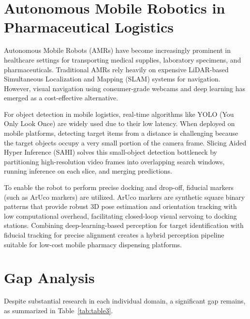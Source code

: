 \documentclass[12pt,a4paper,oneside]{report}
\begin{document}
\section{Autonomous Mobile Robotics in Pharmaceutical
Logistics}\label{autonomous-mobile-robotics-in-pharmaceutical-logistics}

Autonomous Mobile Robots (AMRs) have become increasingly prominent in
healthcare settings for transporting medical supplies, laboratory
specimens, and pharmaceuticals. Traditional AMRs rely heavily on
expensive LiDAR-based Simultaneous Localization and Mapping (SLAM)
systems for navigation. However, visual navigation using consumer-grade
webcams and deep learning has emerged as a cost-effective alternative.

For object detection in mobile logistics, real-time algorithms like YOLO
(You Only Look Once) are widely used due to their low latency. When
deployed on mobile platforms, detecting target items from a distance is
challenging because the target objects occupy a very small portion of
the camera frame. Slicing Aided Hyper Inference (SAHI) solves this
small-object detection bottleneck by partitioning high-resolution video
frames into overlapping search windows, running inference on each slice,
and merging predictions.

To enable the robot to perform precise docking and drop-off, fiducial
markers (such as ArUco markers) are utilized. ArUco markers are
synthetic square binary patterns that provide robust 3D pose estimation
and orientation tracking with low computational overhead, facilitating
closed-loop visual servoing to docking stations. Combining
deep-learning-based perception for target identification with fiducial
tracking for precise alignment creates a hybrid perception pipeline
suitable for low-cost mobile pharmacy dispensing platforms.

\section{Gap Analysis}\label{gap-analysis}

Despite substantial research in each individual domain, a significant
gap remains, as summarized in Table~\ref{tab:table3}.
\end{document}
